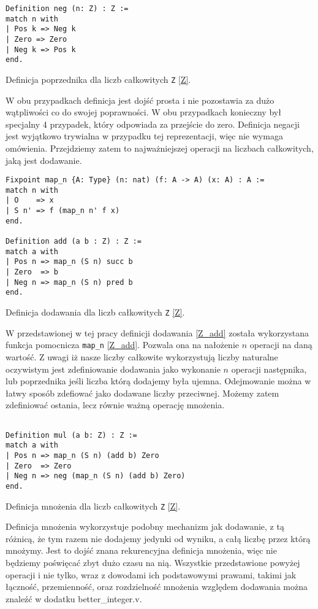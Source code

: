\begin{code}
\begin{verbatim}
Definition neg (n: Z) : Z :=
match n with
| Pos k => Neg k
| Zero => Zero
| Neg k => Pos k
end.
\end{verbatim}
\caption{Definicja poprzednika dla liczb całkowitych \texttt{Z} \ref{Z}.}
\label{Z_neg}
\end{code}
W obu przypadkach definicja jest dojść prosta i nie pozostawia za dużo wątpliwości co do swojej poprawności. W obu przypadkach konieczny był specjalny 4 przypadek, który odpowiada za przejście do zero. Definicja negacji jest wyjątkowo trywialna w przypadku tej reprezentacji, więc nie wymaga omówienia. Przejdziemy zatem to najważniejszej operacji na liczbach całkowitych, jaką jest dodawanie.
\begin{code}
\begin{verbatim}
Fixpoint map_n {A: Type} (n: nat) (f: A -> A) (x: A) : A :=
match n with
| O    => x
| S n' => f (map_n n' f x)
end.

Definition add (a b : Z) : Z :=
match a with 
| Pos n => map_n (S n) succ b
| Zero  => b
| Neg n => map_n (S n) pred b
end.
\end{verbatim}
\caption{Definicja dodawania dla liczb całkowitych \texttt{Z} \ref{Z}.}
\label{Z_add}
\end{code}

W przedstawionej w tej pracy definicji dodawania \ref{Z_add} została wykorzystana funkcja pomocnicza \texttt{map_n} \ref{Z_add}. Pozwala ona na nałożenie $n$ operacji na daną wartość. Z uwagi iż nasze liczby całkowite wykorzystują liczby naturalne oczywistym jest zdefiniowanie dodawania jako wykonanie $n$ operacji następnika, lub poprzednika jeśli liczba którą dodajemy była ujemna. Odejmowanie można w łatwy sposób zdefiować jako dodawane liczby przeciwnej. Możemy zatem zdefiniować ostania, lecz równie ważną operację mnożenia.
\begin{code}
\begin{verbatim}

Definition mul (a b: Z) : Z :=
match a with 
| Pos n => map_n (S n) (add b) Zero
| Zero  => Zero
| Neg n => neg (map_n (S n) (add b) Zero)
end.
\end{verbatim}
\caption{Definicja mnożenia dla liczb całkowitych \texttt{Z} \ref{Z}.}
\label{Z_mul}
\end{code}

Definicja mnożenia wykorzystuje podobny mechanizm jak dodawanie, z tą różnicą, że tym razem nie dodajemy jedynki od wyniku, a całą liczbę przez którą mnożymy. Jest to dojść znana rekurencyjna definicja mnożenia, więc nie będziemy poświęcać zbyt dużo czasu na nią. Wszystkie przedstawione powyżej operacji i nie tylko, wraz z dowodami ich podstawowymi prawami, takimi jak łączność, przemienność, oraz rozdzielność mnożenia względem dodawania można znaleźć w dodatku better\_integer.v.
